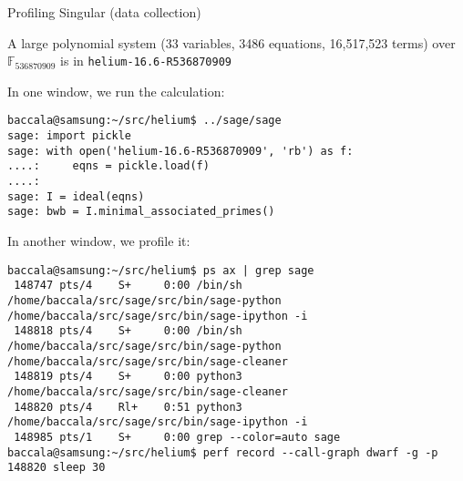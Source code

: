 \documentclass[11pt]{beamer}
\begin{document}
\begin{frame}[fragile]{Profiling Singular (data collection)}

A large polynomial system (33 variables, 3486 equations, 16,517,523 terms) over $\mathbb{F}_{536870909}$ is in {\tt helium-16.6-R536870909}

\vskip 12pt

In one window, we run the calculation:

{\tiny\begin{verbatim}
baccala@samsung:~/src/helium$ ../sage/sage
sage: import pickle
sage: with open('helium-16.6-R536870909', 'rb') as f:
....:     eqns = pickle.load(f)
....: 
sage: I = ideal(eqns)
sage: bwb = I.minimal_associated_primes()
\end{verbatim}}

In another window, we profile it:

{\tiny\begin{verbatim}
baccala@samsung:~/src/helium$ ps ax | grep sage
 148747 pts/4    S+     0:00 /bin/sh /home/baccala/src/sage/src/bin/sage-python /home/baccala/src/sage/src/bin/sage-ipython -i
 148818 pts/4    S+     0:00 /bin/sh /home/baccala/src/sage/src/bin/sage-python /home/baccala/src/sage/src/bin/sage-cleaner
 148819 pts/4    S+     0:00 python3 /home/baccala/src/sage/src/bin/sage-cleaner
 148820 pts/4    Rl+    0:51 python3 /home/baccala/src/sage/src/bin/sage-ipython -i
 148985 pts/1    S+     0:00 grep --color=auto sage
baccala@samsung:~/src/helium$ perf record --call-graph dwarf -g -p 148820 sleep 30
\end{verbatim}}
\end{frame}
\end{document}
